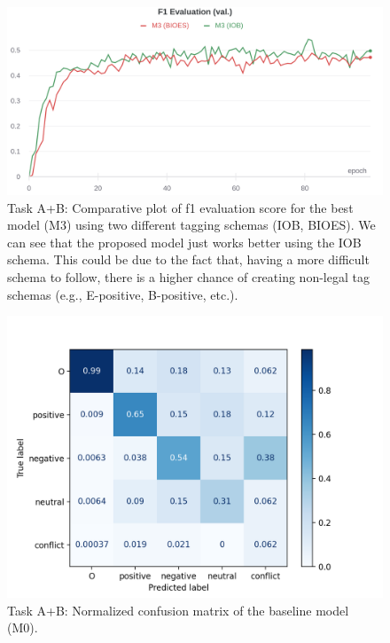 \documentclass[11pt,a4paper]{article}
\begin{document}
	\begin{figure}[H]
		\centering
		\includegraphics[width=1\columnwidth]{M3_ab_IOB_vs_BIOES_f1_eval.png}
		\caption{Task A+B: Comparative plot of f1 evaluation score for the best model (M3) using two different tagging schemas (IOB, BIOES). We can see that the proposed model just works better using the IOB schema. This could be due to the fact that, having a more difficult schema to follow, there is a higher chance of creating non-legal tag schemas (e.g., E-positive, B-positive, etc.).}
		\label{fig:IOB_vs_BIOES_eval}
	\end{figure}
	
	\begin{figure}[H]
		\centering
		\includegraphics[width=1\columnwidth]{M0_ab_confusion_matrix.png}
		\caption{Task A+B: Normalized confusion matrix of the baseline model (M0).}
		\label{fig:cm_M0}
	\end{figure}
	
\end{document}
